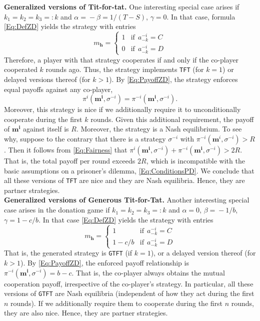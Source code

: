 \documentclass[9pt,twoside,lineno]{pnas-new}
\theoremstyle{plainCl1}
\theoremstyle{plainCl2}
\def\tft{\texttt{TFT}}
\def\gtft{\texttt{GTFT}}
\begin{document}
\noindent
{\bf Generalized versions of Tit-for-tat.} 
One interesting special case arises if $k_1\!=\!k_2\!=\!k_3\!=:\!k$ and $\alpha
\!=\! -\beta \!=\!1/(T\!-\!S)$, $\gamma \!=\! 0$. In that case, formula
\eqref{Eq:DefZD} yields the strategy with entries
\begin{equation*}
m_\mathbf{h} = \left\{
\begin{array}{ll}
1	&\text{if}~~a^{-i}_{-k}=C\\[0.2cm]
0	&\text{if}~~a^{-i}_{-k}=D
\end{array}
\right.
\end{equation*}
Therefore, a player with that strategy cooperates if and only if the co-player cooperated $k$ rounds ago. 
Thus, the strategy implements \tft{} (for $k\!=\!1$) or delayed versions thereof (for $k\!>\!1$). 
By \eqref{Eq:PayoffZD}, the strategy enforces equal payoffs against any co-player, 
\begin{equation} \label{Eq:Fairness}
\pi^i(\mathbf{m^i},\sigma^{-i}) \!=\! \pi^{-i}(\mathbf{m^i},\sigma^{-i}).
\end{equation} 
Moreover, this strategy is nice if we additionally require it to unconditionally cooperate during the first $k$ rounds. 
Given this additional requirement, the payoff of $\mathbf{m^i}$ against itself is $R$. 
Moreover, the strategy is a Nash equilibrium. To see why, suppose to the contrary that there is a strategy $\sigma^{-i}$ with $\pi^{-i}(\mathbf{m}^i,\sigma^{-i}) \!>\! R$. Then it follows from \eqref{Eq:Fairness} that $\pi^i(\mathbf{m^i},\sigma^{-i}) \!+\! \pi^{-i}(\mathbf{m^i},\sigma^{-i})\!>\!2R$. That is, the total  payoff per round exceeds $2R$, which is incompatible with the basic assumptions on a prisoner's dilemma, \eqref{Eq:ConditionsPD}. We conclude that all these versions of \tft{} are nice and they are Nash equilibria. Hence, they are partner strategies.\\

\noindent
{\bf Generalized versions of Generous Tit-for-Tat.}
Another interesting special case arises in the donation game if $k_1\!=\!k_2\!=\!k_3\!=:\!k$ and
$\alpha\!=\!0$, $\beta\!=\!-1/b$, $\gamma\!=\!1\!-\!c/b$. In that case
\eqref{Eq:DefZD} yields the strategy with entries
\begin{equation*}
m_\mathbf{h} = \left\{
\begin{array}{ll}
1	&\text{if}~~a^{-i}_{-k}=C\\[0.2cm]
1-c/b	&\text{if}~~a^{-i}_{-k}=D
\end{array}
\right.
\end{equation*}
That is, the generated strategy is \gtft{} (if $k\!=\!1$), or a delayed version
thereof (for $k\!>\!1$). By \eqref{Eq:PayoffZD}, the enforced payoff
relationship is $\pi^{-i}(\mathbf{m^{i}}, \sigma^{-i})\!=\!b\!-\!c$. 
That is, the co-player always obtains the mutual cooperation payoff, irrespective of the co-player's strategy. 
In particular, all these versions of \gtft{} are Nash equilibria  (independent of how they act during the first $n$ rounds).
If we additionally require them to cooperate during the first $n$ rounds, they are also nice. 
Hence, they are partner strategies.
\end{document}
